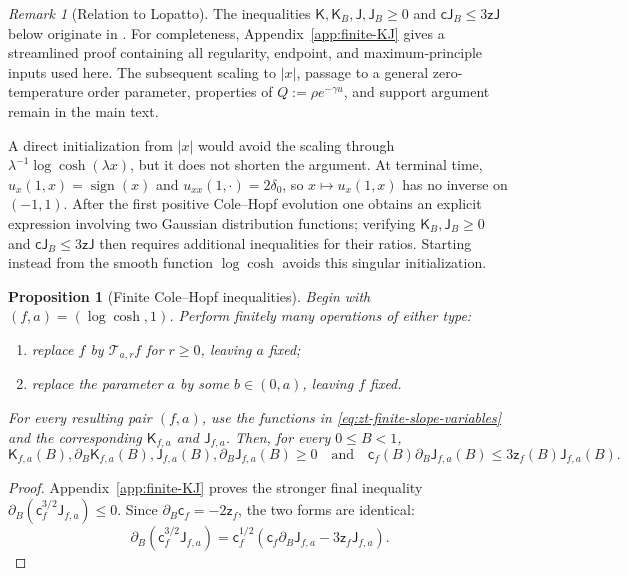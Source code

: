 \documentclass[10pt]{amsart}
\newtheorem{proposition}[proposition]{Proposition}
\theoremstyle{definition}
\theoremstyle{remark}
\newtheorem{remark}[remark]{Remark}
\numberwithin{equation}{section}
\newcommand{\1}{\mathbf 1}
\begin{document}
\begin{remark}[Relation to Lopatto]
\label{rem:zt-finite-KJ}
The inequalities $\mathsf K,\mathsf K_B,\mathsf J,\mathsf J_B\geq0$ and $\mathsf c\mathsf J_B\leq3\mathsf z\mathsf J$ below originate in \cite[Proposition~3.6]{Lopatto2026}. For completeness, Appendix~\ref{app:finite-KJ} gives a streamlined proof containing all regularity, endpoint, and maximum-principle inputs used here. The subsequent scaling to $|x|$, passage to a general zero-temperature order parameter, properties of $Q:=\rho e^{-\gamma u}$, and support argument remain in the main text.

A direct initialization from $|x|$ would avoid the scaling through $\lambda^{-1}\log\cosh(\lambda x)$, but it does not shorten the argument. At terminal time, $u_x(1,x)=\operatorname{sign}(x)$ and $u_{xx}(1,\cdot)=2\delta_0$, so $x\mapsto u_x(1,x)$ has no inverse on $(-1,1)$. After the first positive Cole--Hopf evolution one obtains an explicit expression involving two Gaussian distribution functions; verifying $\mathsf K_B,\mathsf J_B\geq0$ and $\mathsf c\mathsf J_B\leq3\mathsf z\mathsf J$ then requires additional inequalities for their ratios. Starting instead from the smooth function $\log\cosh$ avoids this singular initialization.
\end{remark}

\begin{proposition}[Finite Cole--Hopf inequalities]
\label{prop:zt-finite-KJ}
Begin with $(f,a)=(\log\cosh,1)$.  Perform finitely many operations of either type:
\begin{enumerate}[label=\textup{(\roman*)},leftmargin=2.2em]
\item replace $f$ by $\mathcal T_{a,r}f$ for $r\geq0$, leaving $a$ fixed;
\item replace the parameter $a$ by some $b\in(0,a)$, leaving $f$ fixed.
\end{enumerate}
For every resulting pair $(f,a)$, use the functions in \eqref{eq:zt-finite-slope-variables} and the corresponding $\mathsf K_{f,a}$ and $\mathsf J_{f,a}$. Then, for every $0\leq B<1$,
\begin{equation*}
 \mathsf K_{f,a}(B),\partial_B\mathsf K_{f,a}(B),\mathsf J_{f,a}(B),\partial_B\mathsf J_{f,a}(B)\geq0
 \quad\text{and}\quad \mathsf c_f(B)\partial_B\mathsf J_{f,a}(B)\leq3\mathsf z_f(B)\mathsf J_{f,a}(B).
\end{equation*}
\end{proposition}

\begin{proof}
Appendix~\ref{app:finite-KJ} proves the stronger final inequality $\partial_B(\mathsf c_f^{3/2}\mathsf J_{f,a})\leq0$. Since $\partial_B\mathsf c_f=-2\mathsf z_f$, the two forms are identical:
\begin{equation*}
 \partial_B(\mathsf c_f^{3/2}\mathsf J_{f,a})
 =\mathsf c_f^{1/2}(\mathsf c_f\partial_B\mathsf J_{f,a}-3\mathsf z_f\mathsf J_{f,a}).
\end{equation*}
\end{proof}
\end{document}

